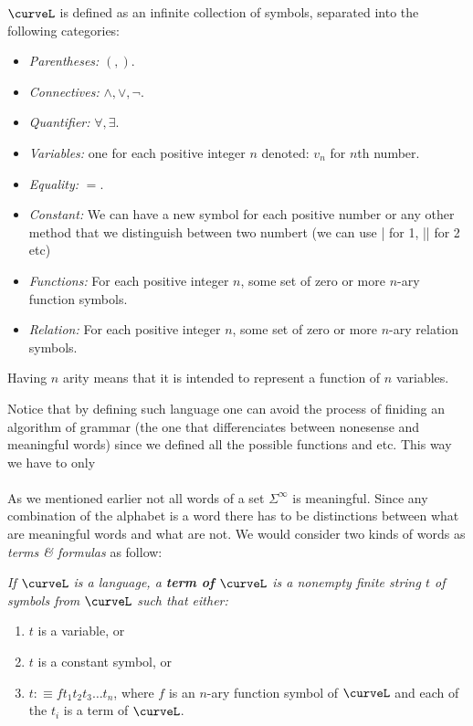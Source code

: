 
 $\curveL$ is defined as an infinite collection of symbols, separated into the following categories:
\begin{itemize}
    \item \textit{Parentheses:} $(,)$.
    \item \textit{Connectives:} $\land, \lor, \neg$.
    \item \textit{Quantifier:} $\forall, \exists$.
    \item \textit{Variables:} one for each positive integer $n$ denoted: $v_n$ for $n$th number.
    \item \textit{Equality:} $=$.
    \item \textit{Constant:} We can have a new symbol for each positive number or any other method that we distinguish between two numbert (we can use | for 1, || for 2 etc)
    \item \textit{Functions:} For each positive integer $n$, some set of zero or more $n$-ary function symbols.
    \item \textit{Relation:} For each positive integer $n$, some set of zero or more $n$-ary relation symbols.
\end{itemize}
\begin{callout}
    Having $n$ arity means that it is intended to represent a function of $n$ variables.
\end{callout}
Notice that by defining such language one can avoid the process of finiding an algorithm of grammar (the one that differenciates between nonesense and meaningful words) since we defined all the possible functions and etc. This way we have to only
\\
\\
 As we mentioned earlier not all words of a set $\Sigma^\infty$ is meaningful. Since any combination of the alphabet is a word there has to be distinctions between what are meaningful words and what are not. We would consider two kinds of words as \textit{terms \& formulas} as follow:
\begin{define}
    \textit{If $\curveL$ is a language, a \textbf{term of $\curveL$} is a nonempty finite string $t$ of symbols from $\curveL$ such that either:}
    \begin{enumerate}
        \item $t$ is a variable, or
        \item $t$ is a constant symbol, or 
        \item $t:\equiv ft_1t_2t_3\dots t_n$, where $f$ is an $n$-ary function symbol of $\curveL$ and each of the $t_i$ is a term of $\curveL$.
    \end{enumerate}

\end{define}



